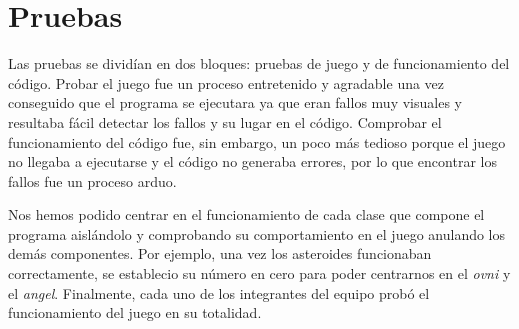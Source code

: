 \section{Pruebas}
Las pruebas se dividían en dos bloques: pruebas de juego y de funcionamiento del código. 
Probar el juego fue un proceso entretenido y agradable una vez conseguido que el programa se ejecutara ya que eran fallos muy visuales y resultaba fácil detectar los fallos y su lugar en el código.
Comprobar el funcionamiento del código fue, sin embargo, un poco más tedioso porque el juego no llegaba a ejecutarse y el código no generaba errores, por lo que encontrar los fallos fue un proceso arduo.

Nos hemos podido centrar en el funcionamiento de cada clase que compone el programa aislándolo y comprobando su comportamiento en el juego anulando los demás componentes. Por ejemplo, una vez los asteroides funcionaban correctamente, se establecio su número en cero para poder centrarnos en el \emph{ovni} y el \emph{angel}. Finalmente, cada uno de los integrantes del equipo probó el funcionamiento del juego en su totalidad.